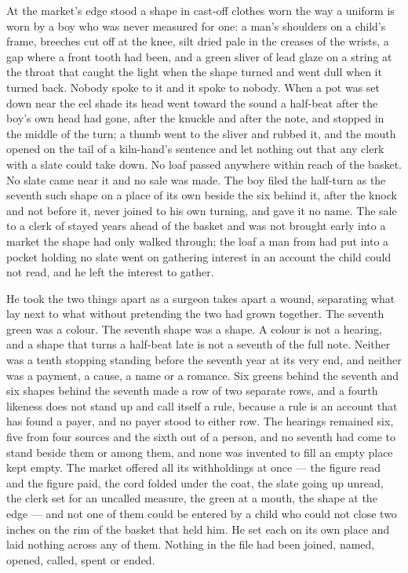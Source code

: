 At the market's edge stood a shape in cast-off clothes worn the way a uniform is worn by a boy who was never measured for one: a man's shoulders on a child's frame, breeches cut off at the knee, silt dried pale in the creases of the wrists, a gap where a front tooth had been, and a green sliver of lead glaze on a string at the throat that caught the light when the shape turned and went dull when it turned back. Nobody spoke to it and it spoke to nobody. When a pot was set down near the eel shade its head went toward the sound a half-beat after the boy's own head had gone, after the knuckle and after the note, and stopped in the middle of the turn; a thumb went to the sliver and rubbed it, and the mouth opened on the tail of a kiln-hand's sentence and let nothing out that any clerk with a slate could take down. No loaf passed anywhere within reach of the basket. No slate came near it and no sale was made. The boy filed the half-turn as the seventh such shape on a place of its own beside the six behind it, after the knock and not before it, never joined to his own turning, and gave it no name. The sale to a clerk of  stayed years ahead of the basket and was not brought early into a market the shape had only walked through; the loaf a man from  had put into a pocket holding no slate went on gathering interest in an account the child could not read, and he left the interest to gather.

\scenebreak

He took the two things apart as a surgeon takes apart a wound, separating what lay next to what without pretending the two had grown together. The seventh green was a colour. The seventh shape was a shape. A colour is not a hearing, and a shape that turns a half-beat late is not a seventh of the full note. Neither was a tenth stopping standing before the seventh year at its very end, and neither was a payment, a cause, a name or a romance. Six greens behind the seventh and six shapes behind the seventh made a row of two separate rows, and a fourth likeness does not stand up and call itself a rule, because a rule is an account that has found a payer, and no payer stood to either row. The hearings remained six, five from four sources and the sixth out of a person, and no seventh had come to stand beside them or among them, and none was invented to fill an empty place kept empty. The market offered all its withholdings at once --- the figure read and the figure paid, the cord folded under the coat, the slate going up unread, the clerk set for an uncalled measure, the green at a mouth, the shape at the edge --- and not one of them could be entered by a child who could not close two inches on the rim of the basket that held him. He set each on its own place and laid nothing across any of them. Nothing in the file had been joined, named, opened, called, spent or ended.

